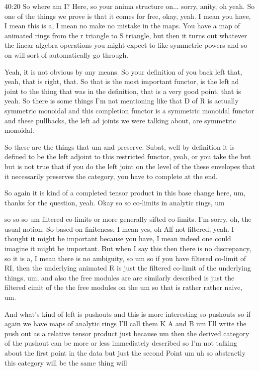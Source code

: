 \begin{unfinished}{40:20}
So where am I? Here, so your anima structure on... sorry, anity, oh yeah. So one of the things we prove is that it comes for free, okay, yeah. I mean you have, I mean this is a, I mean no make no mistake in the maps. You have a map of animated rings from the r triangle to S triangle, but then it turns out whatever the linear algebra operations you might expect to like symmetric powers and so on will sort of automatically go through. 

Yeah, it is not obvious by any means. So your definition of you back left that, yeah, that is right, that. So that is the most important functor, is the left ad joint to the thing that was in the definition, that is a very good point, that is yeah. So there is some things I'm not mentioning like that D of R is actually symmetric monoidal and this completion functor is a symmetric monoidal functor and these pullbacks, the left ad joints we were talking about, are symmetric monoidal. 

So these are the things that um and preserve. Subat, well by definition it is defined to be the left adjoint to this restricted functor, yeah, or you take the but but is not true that if you do the left joint on the level of the these envelopes that it necessarily preserves the category, you have to complete at the end. 

So again it is kind of a completed tensor product in this base change here, um, thanks for the question, yeah. Okay so so co-limits in analytic rings, um

 so so so um filtered co-limits or more generally sifted co-limits. I'm sorry, oh, the usual notion. So based on finiteness, I mean yes, oh Alf not filtered, yeah. I thought it might be important because you have, I mean indeed one could imagine it might be important. But when I say this then there is no discrepancy, so it is a, I mean there is no ambiguity, so um so if you have filtered co-limit of RI, then the underlying animated R is just the filtered co-limit of the underlying things, um, and also the free modules are are similarly described is just the filtered cimit of the the free modules on the um so that is rather rather naive, um. 

And what's kind of left is pushouts and this is more interesting so pushouts so if again we have maps of analytic rings I'll call them K A and B um I'll write the push out as a relative tensor product just because um then the derived category of the pushout can be more or less immediately described so I'm not talking about the first point in the data but just the second Point um uh so abstractly this category will be the same thing will


\end{unfinished}
